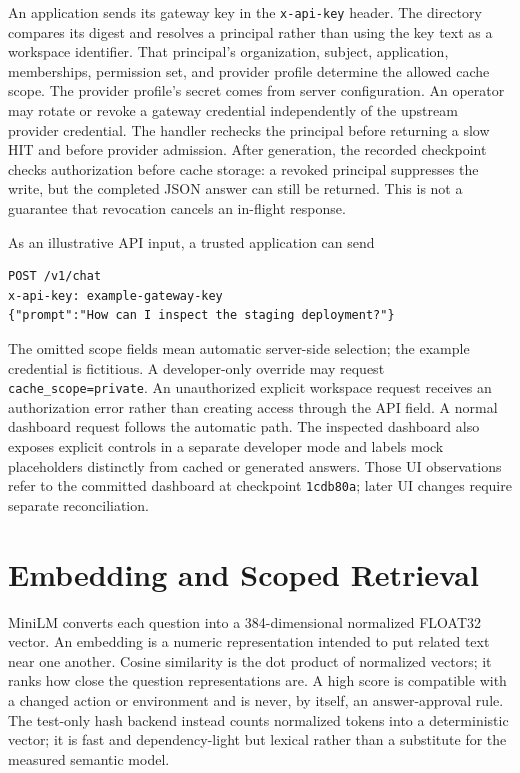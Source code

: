 An application sends its gateway key in the \texttt{x-api-key} header. The directory compares its digest and resolves a principal rather than using the key text as a workspace identifier. That principal's organization, subject, application, memberships, permission set, and provider profile determine the allowed cache scope. The provider profile's secret comes from server configuration. An operator may rotate or revoke a gateway credential independently of the upstream provider credential. The handler rechecks the principal before returning a slow HIT and before provider admission. After generation, the recorded checkpoint checks authorization before cache storage: a revoked principal suppresses the write, but the completed JSON answer can still be returned. This is not a guarantee that revocation cancels an in-flight response.

As an illustrative API input, a trusted application can send
\begin{lstlisting}
POST /v1/chat
x-api-key: example-gateway-key
{"prompt":"How can I inspect the staging deployment?"}
\end{lstlisting}
The omitted scope fields mean automatic server-side selection; the example credential is fictitious. A developer-only override may request \texttt{cache\_scope=private}. An unauthorized explicit workspace request receives an authorization error rather than creating access through the API field. A normal dashboard request follows the automatic path. The inspected dashboard also exposes explicit controls in a separate developer mode and labels mock placeholders distinctly from cached or generated answers. Those UI observations refer to the committed dashboard at checkpoint \texttt{1cdb80a}; later UI changes require separate reconciliation.

\section{Embedding and Scoped Retrieval}
MiniLM converts each question into a 384-dimensional normalized FLOAT32 vector. An embedding is a numeric representation intended to put related text near one another. Cosine similarity is the dot product of normalized vectors; it ranks how close the question representations are. A high score is compatible with a changed action or environment and is never, by itself, an answer-approval rule. The test-only hash backend instead counts normalized tokens into a deterministic vector; it is fast and dependency-light but lexical rather than a substitute for the measured semantic model.

